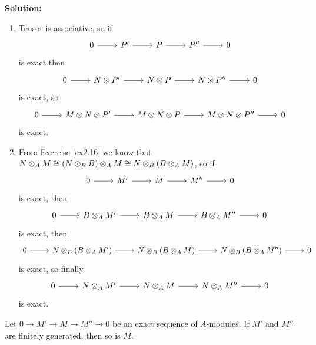 \documentclass{article}
\begin{document}
\noindent\textbf{Solution:}
\begin{enumerate}
    \item
        Tensor is associative, so if
        \[
            \begin{tikzcd}
                0 \arrow[r] & P' \arrow[r] & P \arrow[r] & P'' \arrow[r] & 0
            \end{tikzcd}
        \]
        is exact then
        \[
            \begin{tikzcd}
                0 \arrow[r] & N \tensor P' \arrow[r] & N \tensor P \arrow[r] & N \tensor P'' \arrow[r] & 0
            \end{tikzcd}
        \]
        is exact, so
        \[
            \begin{tikzcd}
                0 \arrow[r] & M \tensor N \tensor P' \arrow[r] & M \tensor N \tensor P \arrow[r] & M \tensor N \tensor P'' \arrow[r] & 0
            \end{tikzcd}
        \]
        is exact.
    \item
        From Exercise \ref{ex2.16} we know that \(N \otimes_A M \cong (N \otimes_B B) \otimes_A M \cong N \otimes_B (B \otimes_A M)\), so if
        \[
            \begin{tikzcd}
                0 \arrow[r] & M' \arrow[r] & M \arrow[r] & M'' \arrow[r] & 0
            \end{tikzcd}
        \]
        is exact, then
        \[
            \begin{tikzcd}
                0 \arrow[r] & B \tensor_A M' \arrow[r] & B \tensor_A M \arrow[r] & B \tensor_A M'' \arrow[r] & 0
            \end{tikzcd}
        \]
        is exact, then
        \[
            \begin{tikzcd}
                0 \arrow[r] & N \tensor_B (B \tensor_A M') \arrow[r] & N \tensor_B (B \tensor_A M) \arrow[r] & N \tensor_B (B \tensor_A M'') \arrow[r] & 0
            \end{tikzcd}
        \]
        is exact, so finally
        \[
            \begin{tikzcd}
                0 \arrow[r] & N \tensor_A M' \arrow[r] & N \tensor_A M \arrow[r] & N \tensor_A M'' \arrow[r] & 0
            \end{tikzcd}
        \]
        is exact.
\end{enumerate}

\begin{exercise}
    Let \(0 \to M' \to M \to M'' \to 0\) be an exact sequence of \(A\)-modules.
    If \(M'\) and \(M''\) are finitely generated, then so is \(M\).
\end{exercise}
\end{document}
